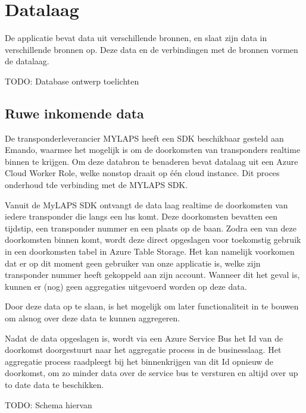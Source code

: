 \section{Datalaag}
De applicatie bevat data uit verschillende bronnen, en slaat zijn data in verschillende bronnen op. Deze data en de verbindingen met de bronnen vormen de datalaag.

{\par \bigskip \par \color{red} TODO: Database ontwerp toelichten \par \bigskip \par }

\subsection{Ruwe inkomende data}

De transponderleverancier MYLAPS heeft een SDK beschikbaar gesteld aan Emando, waarmee het mogelijk is om de doorkomsten van transponders realtime binnen te krijgen. Om deze databron te benaderen bevat datalaag uit een Azure Cloud Worker Role, welke nonstop draait op één cloud instance. Dit proces onderhoud tde verbinding met de MYLAPS SDK.

Vanuit de MyLAPS SDK ontvangt de data laag realtime de doorkomsten van iedere transponder die langs een lus komt. Deze doorkomsten bevatten een tijdstip, een transponder nummer en een plaats op de baan. Zodra een van deze doorkomsten binnen komt, wordt deze direct opgeslagen voor toekomstig gebruik in een doorkomsten tabel in Azure Table Storage. Het kan namelijk voorkomen dat er op dit moment geen gebruiker van onze applicatie is, welke zijn transponder nummer heeft gekoppeld aan zijn account. Wanneer dit het geval is, kunnen er (nog) geen aggregaties uitgevoerd worden op deze data.

Door deze data op te slaan, is het mogelijk om later functionaliteit in te bouwen om alsnog over deze data te kunnen aggregeren.

Nadat de data opgeslagen is, wordt via een Azure Service Bus het Id van de doorkomst doorgestuurt naar het aggregatie process in de businesslaag. Het aggregatie process raadpleegt bij het binnenkrijgen van dit Id opnieuw de doorkomst, om zo minder data over de service bus te versturen en altijd over up to date data te beschikken.

{\par \bigskip \par \color{red} TODO: Schema hiervan \par \bigskip \par }


